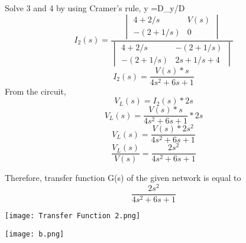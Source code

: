 \documentclass{beamer}
\begin{document}
\begin{frame}
Solve 3 and 4 by using Cramer's rule, y =D_y/D \\
\begin{equation}
    I_2(s)= \frac{\begin{vmatrix} 4 + 2/s & V(s) \\ -(2 + 1/s) & 0 \end{vmatrix}}{\begin{vmatrix} 4 + 2/s &  -(2+1/s) \\  -(2 + 1/s) & 2s + 1/s +4 \end{vmatrix}} \nonumber
\end{equation}
\begin{equation}
    I_2(s)=\frac{V(s)*s}{4s^2 + 6s +  1}\nonumber
\end{equation}
From the circuit,
\begin{equation}
    V_L(s)=I_2(s)*2s\nonumber
\end{equation}
\begin{equation}
    V_L(s)=\frac{V(s)*s}{4s^2 + 6s + 1}*2s\nonumber
\end{equation}
\begin{equation}
    V_L(s)=\frac{V(s)*2s^2}{4s^2 + 6s + 1 }\nonumber
\end{equation}
\begin{equation}
  \frac{V_L(s)}{V(s)}= \frac{2s^2}{4s^2 + 6s + 1 } \nonumber
\end{equation}

\end{frame}
\begin{frame}{}
    Therefore, transfer function G(s) of the given network is equal to 
\begin{equation}
  \frac{2s^2}{4s^2 + 6s + 1 } \nonumber
\end{equation}
\begin{center}
    \texttt{[image: Transfer Function 2.png]}
\end{center}
\end{frame}
\begin{frame}
    \begin{center}
    \texttt{[image: b.png]}
\end{center}
\end{frame}
\end{document}
